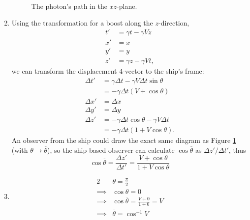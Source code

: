 \documentclass[12pt]{article}
\begin{document}
\begin{enumerate}[label=(\alph*)]
\begin{figure}
{
        }
        \caption{The photon's path in the $xz$-plane.}
        \label{fig1}
    \end{figure}
    \item Using the transformation for a boost along the $z$-direction,
        \begin{align*}
            t' &= \gamma t - \gamma V z \\
            x' &= x \\
            y' &= y \\
            z' &= \gamma z - \gamma V t,
        \end{align*}
        we can transform the displacement 4-vector to the ship's frame:
        \begin{align*}
            \Delta t' &= \gamma\Delta t - \gamma V \Delta t \sin\theta \\
            & = -\gamma\Delta t(V + \cos\theta) \\
            \Delta x' & = \Delta x \\
            \Delta y' &= \Delta y \\
            \Delta z' &= -\gamma\Delta t \cos\theta - \gamma V \Delta t \\
            &= -\gamma \Delta t (1 + V\cos\theta).
        \end{align*}
        An observer from the ship could draw the exact same diagram as Figure \ref{fig1} (with $\theta \to \overline{\theta}$), so the ship-based observer can calculate $\cos\overline{\theta}$ as $\Delta z' / \Delta t'$, thus
        \[ \cos\overline{\theta} = \frac{\Delta z'}{\Delta t'} = \frac{V + \cos\theta}{1 + V\cos\theta} \]
    \item 
        \begin{alignat*}{2}
             \quad &\theta = \frac{\pi}{2} \\
            \implies & \cos\theta = 0 \\
            \implies & \cos\overline{\theta} = \frac{V + 0}{1 + 0} = V \\
            \implies & \overline{\theta} = \cos^{-1}V
        \end{alignat*}

\end{enumerate}
\end{document}
